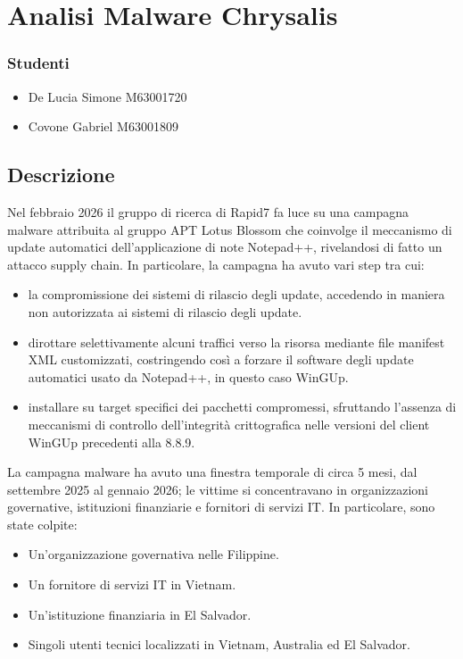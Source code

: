 \chapter{Analisi Malware Chrysalis}

\subsection*{Studenti}
\begin{itemize}
  \item De Lucia Simone M63001720
  \item Covone Gabriel M63001809
\end{itemize}

\section{Descrizione}
Nel febbraio 2026 il gruppo di ricerca di Rapid7 fa luce su una campagna malware attribuita al gruppo APT Lotus Blossom che coinvolge il meccanismo di update automatici dell'applicazione di note Notepad++, rivelandosi di fatto un attacco supply chain. In particolare, la campagna ha avuto vari step tra cui:
\begin{itemize}
  \item la compromissione dei sistemi di rilascio degli update, accedendo in maniera non autorizzata ai sistemi di rilascio degli update.
  \item dirottare selettivamente alcuni traffici verso la risorsa mediante file manifest XML customizzati, costringendo così a forzare il software degli update automatici usato da Notepad++, in questo caso WinGUp.
  \item installare su target specifici dei pacchetti compromessi, sfruttando l'assenza di meccanismi di controllo dell'integrità crittografica nelle versioni del client WinGUp precedenti alla 8.8.9.
\end{itemize}

La campagna malware ha avuto una finestra temporale di circa 5 mesi, dal settembre 2025 al gennaio 2026; le vittime si concentravano in organizzazioni governative, istituzioni finanziarie e fornitori di servizi IT. In particolare, sono state colpite:
\begin{itemize}
  \item Un'organizzazione governativa nelle Filippine.
  \item Un fornitore di servizi IT in Vietnam.
  \item Un'istituzione finanziaria in El Salvador.
  \item Singoli utenti tecnici localizzati in Vietnam, Australia ed El Salvador.
\end{itemize}

